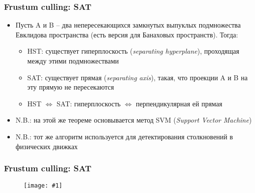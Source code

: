 \documentclass{beamer}
\newcommand{\slideimage}[1]{
  \begin{figure}
    \begin{adjustbox}{width=\textwidth, totalheight=\textheight-2\baselineskip-2\baselineskip,keepaspectratio}
      \texttt{[image: \#1]}
    \end{adjustbox}
  \end{figure}
}
\begin{document}
\begin{frame}[fragile]
\frametitle{Frustum culling: SAT}
\begin{itemize}
\item Пусть A и B -- два непересекающихся замкнутых выпуклых подмножества Евклидова пространства (есть версия для Банаховых пространств). Тогда:
\pause
\begin{itemize}
\item HST: существует гиперплоскость (\textit{separating hyperplane}), проходящая между этими подмножествами
\pause
\item SAT: существует прямая (\textit{separating axis}), такая, что проекции A и B на эту прямую не пересекаются
\pause
\item HST \begin{math}\Leftrightarrow\end{math} SAT: гиперплоскость \begin{math}\Leftrightarrow\end{math} перпендикулярная ей прямая
\end{itemize}
\pause
\item N.B.: на этой же теореме основывается метод SVM (\textit{Support Vector Machine})
\pause
\item N.B.: тот же алгоритм используется для детектирования столкновений в физических движках
\end{itemize}
\end{frame}

\begin{frame}[fragile]
\frametitle{Frustum culling: SAT}
\slideimage{sat.png}
\end{frame}
\end{document}
